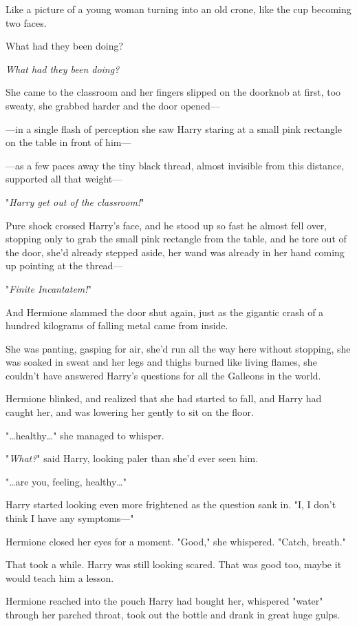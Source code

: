 Like a picture of a young woman turning into an old crone, like the cup
becoming two faces.

What had they been doing?

\emph{What had they been doing?}

She came to the classroom and her fingers slipped on the doorknob at first, too
sweaty, she grabbed harder and the door opened---

---in a single flash of perception she saw Harry staring at a small pink
rectangle on the table in front of him---

---as a few paces away the tiny black thread, almost invisible from this
distance, supported all that weight---

"\emph{Harry get out of the classroom!}"

Pure shock crossed Harry's face, and he stood up so fast he almost fell over,
stopping only to grab the small pink rectangle from the table, and he tore out
of the door, she'd already stepped aside, her wand was already in her hand
coming up pointing at the thread---

"\emph{Finite Incantatem!}"

And Hermione slammed the door shut again, just as the gigantic crash of a
hundred kilograms of falling metal came from inside.

She was panting, gasping for air, she'd run all the way here without stopping,
she was soaked in sweat and her legs and thighs burned like living flames, she
couldn't have answered Harry's questions for all the Galleons in the world.

Hermione blinked, and realized that she had started to fall, and Harry had
caught her, and was lowering her gently to sit on the floor.

"{\ldots}healthy{\ldots}" she managed to whisper.

"\emph{What?}" said Harry, looking paler than she'd ever seen him.

"{\ldots}are you, feeling, healthy{\ldots}"

Harry started looking even more frightened as the question sank in. "I, I don't
think I have any symptoms---"

Hermione closed her eyes for a moment. "Good," she whispered. "Catch, breath."

That took a while. Harry was still looking scared. That was good too, maybe it
would teach him a lesson.

Hermione reached into the pouch Harry had bought her, whispered "water" through
her parched throat, took out the bottle and drank in great huge gulps.

